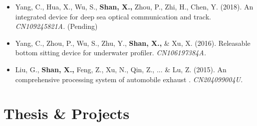 \documentclass[11pt,a4paper,sans]{moderncv}         %
\begin{document}
    \begin{itemize}

        \item{Yang, C., Hua, X., Wu, S., \textbf{Shan, X.,} Zhou, P., Zhi, H., Chen, Y. (2018). An integrated device for deep sea optical communication and track. \textit{CN109245821A.} (Pending)}

        \vspace{3pt}

        \item{Yang, C., Zhou, P., Wu, S., Zhu, Y., \textbf{Shan, X.,} \& Xu, X. (2016). Releasable bottom sitting device for underwater profiler. \textit{CN106197384A.}}

        \vspace{3pt}

        \item{Liu, G., \textbf{Shan, X.,} Feng, Z., Xu, N., Qin, Z., ... \& Lu, Z. (2015). An comprehensive processing system of automobile exhaust . \textit{CN204099004U.}}

        \vspace{3pt}

    \end{itemize}


    



\section{Thesis \& Projects}
\end{document}
